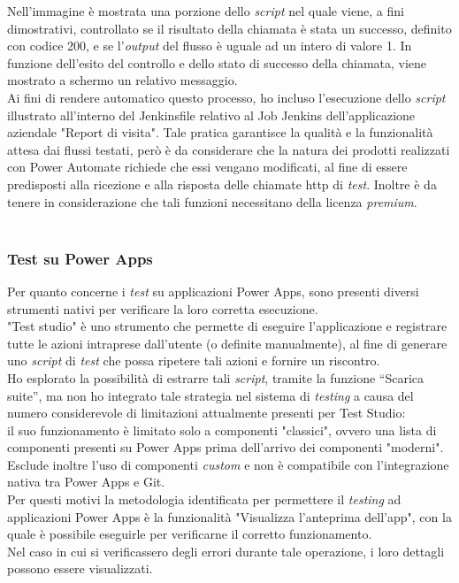 \newline Nell'immagine è mostrata una porzione dello \emph{script} nel quale viene, a fini dimostrativi, controllato se il risultato della chiamata è stata un successo, definito con codice 200, e se l'\emph{output} del flusso è uguale ad un intero di valore 1.
In funzione dell'esito del controllo e dello stato di successo della chiamata, viene mostrato a schermo un relativo messaggio.\\
Ai fini di rendere automatico questo processo, ho incluso l'esecuzione dello \emph{script} illustrato all'interno del Jenkinsfile relativo al Job Jenkins dell'applicazione aziendale "Report di visita".
Tale pratica garantisce la qualità e la funzionalità attesa dai flussi testati, però è da considerare che la natura dei prodotti realizzati con Power Automate richiede che essi vengano modificati, al fine di essere predisposti alla ricezione e alla risposta delle chiamate \gls{http} di \emph{test}.
Inoltre è da tenere in considerazione che tali funzioni necessitano della licenza \emph{premium}.\\\\

\subsubsection*{Test su Power Apps}
Per quanto concerne i \emph{test} su applicazioni Power Apps, sono presenti diversi strumenti nativi per verificare la loro corretta esecuzione.\\
"Test studio" è uno strumento che permette di eseguire l'applicazione e registrare tutte le azioni intraprese dall'utente (o definite manualmente), al fine di generare uno \emph{script} di \emph{test} che possa ripetere tali azioni e fornire un riscontro.\\
Ho esplorato la possibilità di estrarre tali \emph{script}, tramite la funzione “Scarica suite”, ma non ho integrato tale strategia nel sistema di \emph{testing} a causa del numero considerevole di limitazioni attualmente presenti per Test Studio:\\
il suo funzionamento è limitato solo a componenti "classici", ovvero una lista di componenti presenti su Power Apps prima dell'arrivo dei componenti "moderni".\\
Esclude inoltre l'uso di componenti \emph{custom} e non è compatibile con l'integrazione nativa tra Power Apps e Git.\\

Per questi motivi la metodologia identificata per permettere il \emph{testing} ad applicazioni Power Apps è la funzionalità "Visualizza l'anteprima dell'app", con la quale è possibile eseguirle per verificarne il corretto funzionamento.\\
Nel caso in cui si verificassero degli errori durante tale operazione, i loro dettagli possono essere visualizzati.\\

